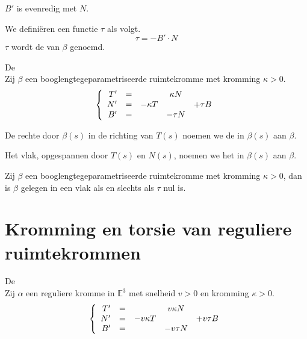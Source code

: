 \documentclass[main.tex]{subfiles}
\begin{document}
\begin{lem}
  $B'$ is evenredig met $N$.
\end{lem}
\begin{de}
  We defini\"eren een functie $\tau$ als volgt.
  \[ \tau = -B' \cdot N \]
  $\tau$ wordt de  van $\beta$ genoemd.
\end{de}

\begin{st}
  De \\
  Zij $\beta$ een booglengtegeparametriseerde ruimtekromme met kromming $\kappa>0$.
  \[
  \left\{
    \begin{array}{r cccc}
      T' &=& & \kappa N &\\
      N' &=& -\kappa T & & +\tau B\\
      B' &=& & -\tau N &\\
    \end{array}
  \right.
  \]
\end{st}

\begin{de}
  De rechte door $\beta(s)$ in de richting van $T(s)$ noemen we de  in $\beta(s)$ aan $\beta$.
\end{de}

\begin{de}
  Het vlak, opgespannen door $T(s)$ en $N(s)$, noemen we het  in $\beta(s)$ aan $\beta$.
\end{de}

\begin{st}
  Zij $\beta$ een booglengtegeparametriseerde ruimtekromme met kromming $\kappa> 0$, dan is $\beta$ gelegen in een vlak als en slechts als $\tau$ nul is.
\end{st}

\section{Kromming en torsie van reguliere ruimtekrommen}
\label{sec:kromming-en-torsie}

\begin{st}
  De \\
  Zij $\alpha$ een reguliere kromme in $\mathbb{E}^{3}$ met snelheid $v>0$ en kromming $\kappa > 0$.
  \[
  \left\{
    \begin{array}{r cccc}
      T' &=& & v\kappa N &\\
      N' &=& -v\kappa T & & +v\tau B\\
      B' &=& & -v\tau N &\\
    \end{array}
  \right.
  \]
\end{st}
\end{document}
